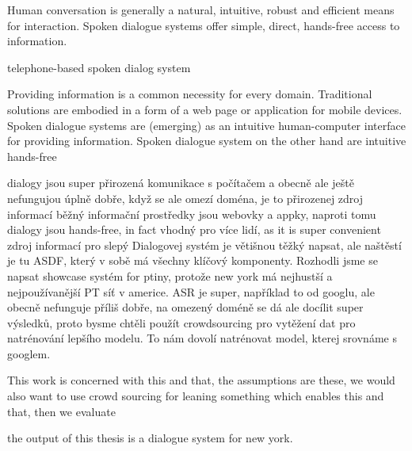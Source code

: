 Human conversation is generally a natural, intuitive, robust and efficient means for interaction.
Spoken dialogue systems offer simple, direct, hands-free access to information.

 telephone-based spoken dialog system






Providing information is a common necessity for every domain.
Traditional solutions are embodied in a form of a web page or application for mobile devices.
Spoken dialogue systems are (emerging) as an intuitive human-computer interface for providing information.
Spoken dialogue system on the other hand are intuitive hands-free



dialogy jsou super přirozená komunikace s počítačem a obecně ale ještě nefungujou úplně dobře,
když se ale omezí doména, je to přirozenej zdroj informací
běžný informační prostředky jsou webovky a appky, naproti tomu dialogy jsou hands-free, in fact vhodný pro více lidí, as it is super convenient zdroj informací pro slepý
Dialogovej systém je větišnou těžký napsat, ale naštěstí je tu ASDF, který v sobě má všechny klíčový komponenty.
Rozhodli jsme se napsat showcase systém for ptiny, protože new york má nejhustší a nejpoužívanější PT síť v americe.
ASR je super, například to od googlu, ale obecně nefunguje příliš dobře, na omezený doméně se dá ale docílit super výsledků,
proto bysme chtěli použít crowdsourcing pro vytěžení dat pro natrénování lepšího modelu.
To nám dovolí natrénovat model, kterej srovnáme s googlem.


This work is concerned with this and that, the assumptions are these, we would also want to use crowd sourcing for leaning something which enables this and that, then we evaluate

the output of this thesis is a dialogue system for new york.

